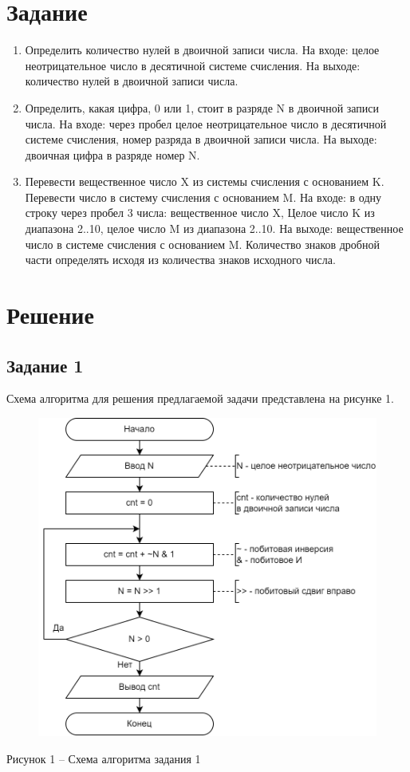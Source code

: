 \documentclass[a4paper,14pt]{extarticle}
\begin{document}
	\section*{Задание}
	\begin{enumerate}
		\item Определить количество нулей в двоичной записи числа. На входе: целое неотрицательное число в десятичной системе счисления. На выходе: количество нулей в двоичной записи числа.
		
		\item Определить, какая цифра, 0 или 1, стоит в разряде N в двоичной записи числа. На входе: через пробел целое неотрицательное число в десятичной системе счисления, номер разряда в двоичной записи числа. На выходе: двоичная цифра в разряде номер N.
		
		\item Перевести вещественное число X из системы счисления с основанием K. Перевести число в систему счисления с основанием M. На входе: в одну строку через пробел 3 числа: вещественное число X, Целое число K из диапазона 2..10, целое число M из диапазона 2..10. На выходе: вещественное число в системе счисления с основанием M. Количество знаков дробной части определять исходя из количества знаков исходного числа.
	\end{enumerate}
	
	\newpage
	\section*{Решение}
	\subsection*{Задание 1}
	Схема алгоритма для решения предлагаемой задачи представлена на рисунке 1.
	
	\begin{figure}[h]
		\centering
		\includegraphics[width=0.68\linewidth]{schemes/s-1}
	\end{figure}
	\begin{center}
		Рисунок 1 – Схема алгоритма задания 1
	\end{center}
	
\end{document}
